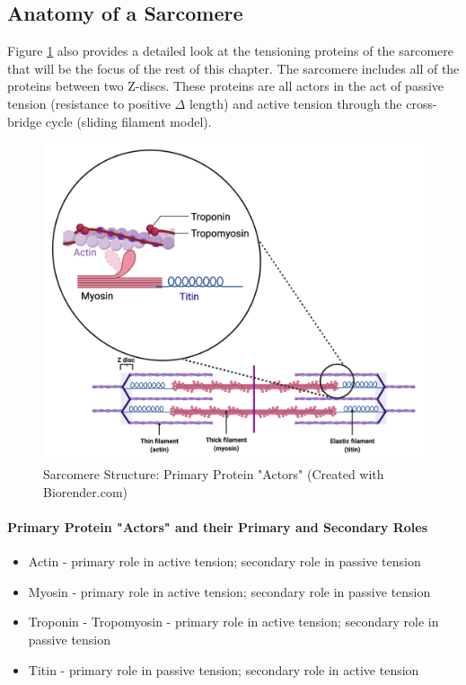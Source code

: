 \subsection{Anatomy of a Sarcomere}
Figure \ref{fig:Sarcomere_Structure} also provides a detailed look at the tensioning proteins of the sarcomere that will be the focus of the rest of this chapter. The sarcomere includes all of the proteins between two Z-discs. These proteins are all actors in the act of passive tension (resistance to positive $\Delta$ length) and active tension through the cross-bridge cycle (sliding filament model).

\begin{figure}[!ht]
    \centering
    \includegraphics[width=1\linewidth]{./figure/Sarcomere_Structure.png}
    \caption{Sarcomere Structure: Primary Protein "Actors" \footnotesize{(Created with Biorender.com)}}
    \label{fig:Sarcomere_Structure}
\end{figure}

\paragraph{Primary Protein "Actors" and their Primary and Secondary Roles}
\begin{itemize}
\item Actin - primary role in active tension; secondary role in passive tension
\item Myosin - primary role in active tension; secondary role in passive tension
\item Troponin - Tropomyosin - primary role in active tension; secondary role in passive tension
\item Titin - primary role in passive tension; secondary role in active tension
\end{itemize}

